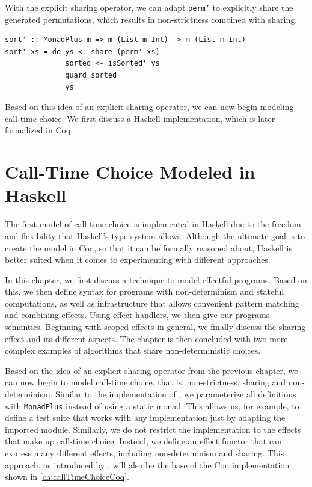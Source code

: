 \documentclass[a4paper, 11pt, fleqn, twoside, abstract=on]{scrreprt}
\newcommand{\hinl}[1]{\texttt{#1}}
\begin{document}
With the explicit sharing operator, we can adapt \hinl{perm'} to explicitly share the generated permutations, which results in non-strictness combined with sharing.

\begin{verbatim}
sort' :: MonadPlus m => m (List m Int) -> m (List m Int)
sort' xs = do ys <- share (perm' xs)
              sorted <- isSorted' ys
              guard sorted
              ys
\end{verbatim}

Based on this idea of an explicit sharing operator, we can now begin modeling call-time choice.
We first discuss a Haskell implementation, which is later formalized in Coq.

\chapter{Call-Time Choice Modeled in Haskell}
\label{ch:callTimeChoiceHaskell}
The first model of call-time choice is implemented in Haskell due to the freedom and flexibility that Haskell's type system allows.
Although the ultimate goal is to create the model in Coq, so that it can be formally reasoned about, Haskell is better suited when it comes to experimenting with different approaches.

In this chapter, we first discuss a technique to model effectful programs.
Based on this, we then define syntax for programs with non-determinism and stateful computations, as well as infrastructure that allows convenient pattern matching and combining effects.
Using effect handlers, we then give our programs semantics.
Beginning with scoped effects in general, we finally discuss the sharing effect and its different aspects.
The chapter is then concluded with two more complex examples of algorithms that share non-deterministic choices.

Based on the idea of an explicit sharing operator from the previous chapter, we can now begin to model call-time choice, that is, non-strictness, sharing and non-determinism.
Similar to the implementation of \citet{fischer2009purely}, we parameterize all definitions with \hinl{MonadPlus} instead of using a static monad.
This allows us, for example, to define a test suite that works with any implementation just by adapting the imported module.
Similarly, we do not restrict the implementation to the effects that make up call-time choice.
Instead, we define an effect functor that can express many different effects, including non-determinism and sharing.
This approach, as introduced by \citet{wu2014effect}, will also be the base of the Coq implementation shown in \autoref{ch:callTimeChoiceCoq}.
\end{document}
